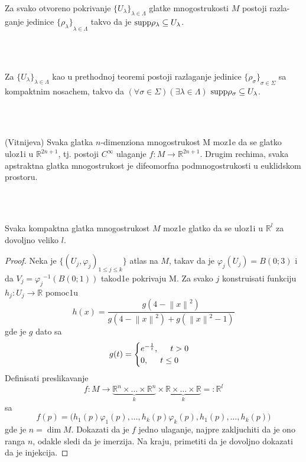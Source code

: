 \documentclass[a4paper,12pt]{article}
\newcommand{\latin}{\fontencoding{T1}\selectfont}
\newcommand{\RR}{\mathbb{R}}
\newcommand{\norm}[1]{\left\lVert#1\right\rVert}
\begin{document}
\begin{tma}
Za svako otvoreno pokrivanje ${\{U_{\lambda} \}}_{\lambda \in \Lambda}$ glatke mnogostrukosti $M$ postoji razla-ganje jedinice ${\{\rho_{\lambda} \}}_{\lambda \in \Lambda}$ takvo da je $\latin{\textrm{supp}} \rho_{\lambda} \subseteq U_{\lambda}$.
\end{tma}
\\ \\
\begin{tma}
Za ${\{U_{\lambda} \}}_{\lambda \in \Lambda}$ kao u prethodnoj teoremi postoji razlaganje jedinice ${\{\rho_{\sigma} \}}_{\sigma \in \Sigma}$ sa kompaktnim nosachem, takvo da $(\forall \sigma \in \Sigma)(\exists \lambda \in \Lambda)$ $\latin{\textrm{supp}} \rho_{\sigma} \subseteq U_{\lambda}$.
\end{tma}
\\ \\
\begin{tma}
(Vitnijeva) Svaka glatka $n$-dimenziona mnogostrukost M moz1e da se glatko uloz1i u $\RR^{2n+1}$, tj. postoji $C^{\infty}$ ulaganje  $f:M \to \RR^{2n+1}$. Drugim rechima, svaka apstraktna glatka mnogostrukost je difeomorfna podmnogostrukosti u euklidskom prostoru.
\end{tma}
\\ \\
\begin{tma}
Svaka kompaktna glatka mnogostrukost $M$ moz1e glatko da se uloz1i u $\RR^l$ za dovoljno veliko $l$.
\end{tma}
\begin{proof}
Neka je $\{{(U_j, \varphi_j)}_{1 \leq j \leq k} \}$ atlas na $M$, takav da je $\varphi_j(U_j) = B(0;3)$ i da $V_j = {\varphi_j}^{-1} (B(0;1))$ takod1e pokrivaju M. Za svako $j$ konstruisati funkciju $h_j : U_j \to \RR$ pomoc1u 
\[h(x) = \frac{g(4 - \norm{x}^2)}{g(4 - \norm{x}^2) + g(\norm{x}^2 - 1)}\]
gde je $g$ dato sa
\[
g(t)=
\begin{cases}
e^{-\frac{1}{t}}, \hspace{0.5cm} t>0\\
0, \hspace{0.5cm} t\leq0
\end{cases}
\]
Definisati preslikavanje \[f:M \to \underbrace{\RR^n \times \dots \times \RR^n}_{k}\times \underbrace{\RR \times \dots \times \RR}_{k} =: \RR^l\]
sa 
\[f(p) = \biggl(h_1(p)\varphi_1(p), \dots , h_k(p)\varphi_k(p), h_1(p), \dots , h_k(p)\biggr)\]
gde je $n = \dim M$. Dokazati da je $f$ jedno ulaganje, najpre zakljuchiti da je ono ranga $n$, odakle sledi da je 
imerzija. Na kraju, primetiti da je dovoljno dokazati da je in\-jekcija.
\end{proof}
\end{document}
